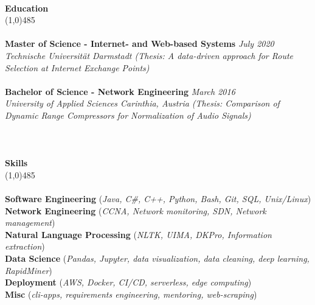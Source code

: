 \documentclass[9pt]{extarticle}
\newcommand\tab[1][1cm]{\hspace*{#1}}
\newcommand\smallspace[1][0.23cm]{\hspace*{#1}}
\newcommand\negativespace[1][-0.12cm]{\hspace*{#1}}
\begin{document}
\noindent %
\\
\vspace*{-6pt}
{\negativespace \Large \bf Education}\\
\line(1,0){485}\\
\\
\noindent
{\bf Master of Science - Internet- and Web-based Systems} \hfill \textit{July 2020} \\ 
\textit{Technische Universität Darmstadt (Thesis: A data-driven approach for Route Selection at Internet Exchange Points)}\\\\
\noindent
{\bf Bachelor of Science - Network Engineering} \hfill \textit{March 2016} \\
\textit{University of Applied Sciences Carinthia, Austria (Thesis: Comparison of Dynamic Range Compressors for Normalization of Audio Signals)}\\
\\
\\\\
\vspace*{-6pt}
{\negativespace \Large \bf Skills}\\
\line(1,0){485}\\
\\
\noindent
{\bf Software Engineering }(\textit{Java, C\#, C++, Python, Bash, Git, SQL, Unix/Linux}) \\
{\bf Network Engineering }(\textit{CCNA, Network monitoring, SDN, Network management}) \\
{\bf Natural Language Processing }(\textit{NLTK, UIMA, DKPro, Information extraction}) \\
{\bf Data Science }(\textit{Pandas, Jupyter, data visualization, data cleaning, deep learning, RapidMiner}) \\
{\bf Deployment }(\textit{AWS, Docker, CI/CD, serverless, edge computing}) \\
{\bf Misc }(\textit{cli-apps, requirements engineering, mentoring, web-scraping}) \\\\
\end{document}
